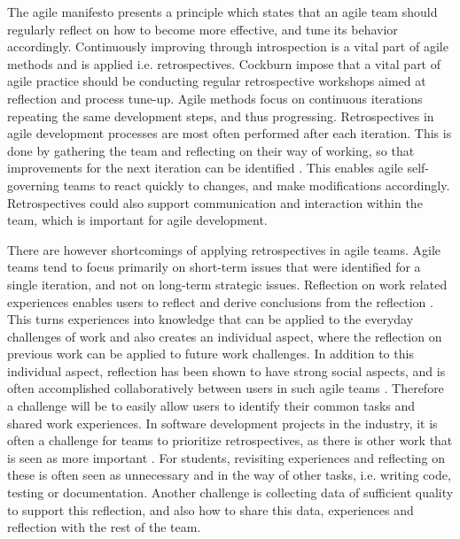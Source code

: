 The agile manifesto presents a principle which states that an agile team should regularly reflect on how to become more effective, and tune its behavior accordingly\citep{Beck2001}. Continuously improving through introspection is a vital part of agile methods and is applied i.e. retrospectives\citep{Beck1999, Derby2006, Maham2008}. Cockburn impose that a vital part of agile practice should be conducting regular retrospective workshops aimed at reflection and process tune-up\citep{Cockburn2006}. Agile methods focus on continuous iterations repeating the same development steps, and thus progressing. Retrospectives in agile development processes are most often performed after each iteration. This is done by gathering the team and reflecting on their way of working, so that improvements for the next iteration can be identified \citep{Derby2006, Drury2011}. This enables agile self-governing teams to react quickly to changes, and make modifications accordingly\citep{Drury2011}. Retrospectives could also support communication and interaction within the team, which is important for agile development. 
 
There are however shortcomings of applying retrospectives in agile teams. Agile teams tend to focus primarily on short-term issues that were identified for a single iteration, and not on long-term strategic issues\citep{Drury2011}. Reflection on work related experiences enables users to reflect and derive conclusions from the reflection \citep{Korthagen_Vasalos_2005}. This turns experiences into knowledge that can be applied to the everyday challenges of work and also creates an individual aspect, where the reflection on previous work can be applied to future work challenges. In addition to this individual aspect, reflection has been shown to have strong social aspects, and is often accomplished collaboratively between users in such agile teams \citep{Høyrup_2004}. Therefore a challenge will be to easily allow users to identify their common tasks and shared work experiences. In software development projects in the industry, it is often a challenge for teams to prioritize retrospectives, as there is other work that is seen as more important \citep{kasi2008post}. For students, revisiting experiences and reflecting on these is often seen as unnecessary and in the way of other tasks, i.e. writing code, testing or documentation. Another challenge is collecting data of sufficient quality to support this reflection, and also how to share this data, experiences and reflection with the rest of the team.  


